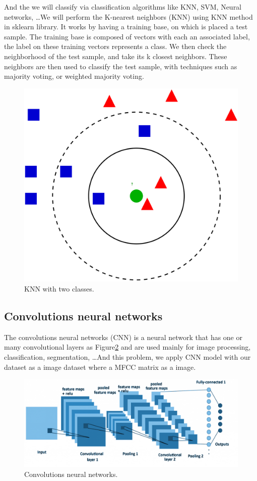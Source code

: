 \documentclass[%
  article,%
  10pt,%
  a4paper,%
  fleqn,%
  oneside,%
  sumario = tradicional,%
  chapter = TITLE,%
  section = TITLE,%
]{abntex2}
\begin{document}
And the we will classify via classification algorithms like KNN, SVM, Neural networks, \dots  We will perform the K-nearest neighbors (KNN) using KNN method in sklearn library. It works by having a training base, on which is placed a test sample. The training base is composed of vectors with each an associated label, the label on these training vectors represents a class. We then check the neighborhood of the test sample, and take its k closest neighbors. These neighbors are then used to classify the test sample, with techniques such as majority voting, or weighted majority voting.

\begin{figure}[H]
  \centering
  \caption{KNN with two classes.}
  \label{fig:knn}
  \includegraphics[width = 0.5\columnwidth]{./Figuras/knn}
\end{figure}

\subsection{Convolutions neural networks}
The convolutions neural networks (CNN) is a neural network that has one or many convolutional layers as Figure\ref{fig:cnn} and are used mainly for image processing, classification, segmentation, \dots And this problem, we apply CNN model with our dataset as a image dataset where a MFCC matrix as a image.

\begin{figure}[H]
  \centering
  \includegraphics[width = 0.8\columnwidth]{./Figuras/cnn-1-1024x420}
  \caption{Convolutions neural networks.}
  \label{fig:cnn}
\end{figure}
\end{document}
